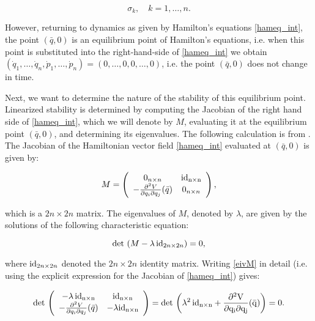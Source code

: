 \documentclass{article}
\begin{document}
\begin{equation}
\sigma_k, \quad k=1, \ldots, n.
\label{eiv_Hess}
\end{equation}


\noindent
However, returning to dynamics as  given by Hamilton's equations \eqref{hameq_int},
the point $(\bar{q}, 0)$ is an equilibrium point of Hamilton's equations, i.e. when this point is substituted into the right-hand-side of \eqref{hameq_int} we obtain
$(\dot{q}_1, \ldots, \dot{q}_n, \dot{p}_1, \ldots, \dot{p}_n) = (0, \ldots, 0, 0, \ldots, 0)$, i.e. the point $(\bar{q}, 0)$ does not change in time.

Next, we want to determine the nature of the stability of this equilibrium point. Linearized stability is determined by computing the Jacobian of the right hand side of  \eqref{hameq_int}, which we will denote by $M$,    evaluating it at the equilibrium point $(\bar{q}, 0)$, and determining its eigenvalues.  The following calculation  is from \cite{ezra2004impenetrable}. 
The Jacobian of the Hamiltonian vector field  \eqref{hameq_int} evaluated at $(\bar{q}, 0)$ is given by:


\begin{equation}
M = 
\left(
\begin{array}{cc}
0_{n\times n} &  \rm{id}_{n \times n} \\
-\frac{\partial^2 V}{\partial q_i \partial q_j} (\bar{q}) & 0_{n\times n} 
\end{array}
\right),
\end{equation}

\noindent
which is a $2n \times 2n$ matrix.  The eigenvalues of $M$, denoted by $\lambda$,  are given by the solutions of the following characteristic equation:

\begin{equation}
{\rm det} \, \left( M - \lambda \, {\rm id}_{2n \times 2n} \right) =0,
\label{eivM}
\end{equation}

\noindent
where ${\rm id}_{2n \times 2n}$ denoted the $2n \times 2n$ identity matrix. Writing \eqref{eivM} in detail (i.e. using the explicit expression for the Jacobian of \eqref{hameq_int}) gives:



\begin{equation}
{\rm det} \, 
\left(
\begin{array}{cc}
-\lambda \, \rm{id}_{n \times n} & \rm{id}_{n \times n} \\
 -\frac{\partial^2 V}{\partial q_i \partial q_j} (\bar{q}) & -\lambda \rm{id}_{n \times n}
 \end{array}
 \right) =  {\rm det} \,  \left(\lambda^2 \, \rm{id}_{n \times n}  + \frac{\partial^2 V}{\partial q_i \partial q_j} (\bar{q})  \right) =0.
 \end{equation}
 
\end{document}
